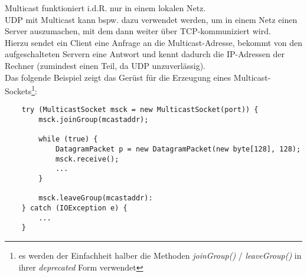 \noindent
Multicast funktioniert i.d.R. nur in einem lokalen Netz.\\

\noindent
UDP mit Multicast kann bspw. dazu verwendet werden, um in einem Netz einen Server auszumachen, mit dem dann weiter über TCP-kommuniziert wird.\\
Hierzu sendet ein Client eine Anfrage an die Multicast-Adresse, bekommt von den aufgeschalteten Servern eine Antwort und kennt dadurch die IP-Adressen der Rechner (zumindest einen Teil, da UDP unzuverlässig).\\

\noindent
Das folgende Beispiel zeigt das Gerüst für die Erzeugung eines Multicast-Sockets\footnote{
es werden der Einfachheit halber die Methoden \textit{joinGroup()} / \textit{leaveGroup()} in ihrer \textit{deprecated} Form verwendet
}:

\begin{verbatim}
    try (MulticastSocket msck = new MulticastSocket(port)) {
        msck.joinGroup(mcastaddr);

        while (true) {
            DatagramPacket p = new DatagramPacket(new byte[128], 128);
            msck.receive();
            ...
        }

        msck.leaveGroup(mcastaddr):
    } catch (IOException e) {
        ...
    }
\end{verbatim}